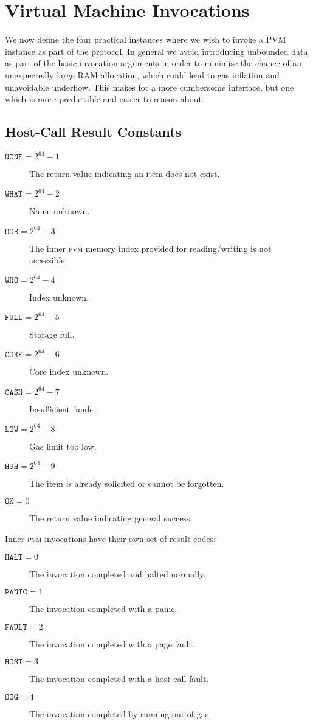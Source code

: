 \section{Virtual Machine Invocations}\label{sec:virtualmachineinvocations}

We now define the four practical instances where we wish to invoke a PVM instance as part of the protocol. In general we avoid introducing unbounded data as part of the basic invocation arguments in order to minimise the chance of an unexpectedly large RAM allocation, which could lead to gas inflation and unavoidable underflow. This makes for a more cumbersome interface, but one which is more predictable and easier to reason about.

\newcommand*{\pvm}{\mathbf{M}}
\newcommand*{\segoff}{\varsigma}
\newcommand*{\execst}{\varepsilon}

\subsection{Host-Call Result Constants}

\begin{description}
  \item[$\mathtt{NONE} = 2^{64} - 1$] The return value indicating an item does not exist.
  \item[$\mathtt{WHAT} = 2^{64} - 2$] Name unknown.
  \item[$\mathtt{OOB} = 2^{64} - 3$] The inner \textsc{pvm} memory index provided for reading/writing is not accessible.
  \item[$\mathtt{WHO} = 2^{64} - 4$] Index unknown.
  \item[$\mathtt{FULL} = 2^{64} - 5$] Storage full.
  \item[$\mathtt{CORE} = 2^{64} - 6$] Core index unknown.
  \item[$\mathtt{CASH} = 2^{64} - 7$] Insufficient funds.
  \item[$\mathtt{LOW} = 2^{64} - 8$] Gas limit too low.
  \item[$\mathtt{HUH} = 2^{64} - 9$] The item is already solicited or cannot be forgotten.
  \item[$\mathtt{OK} = 0$] The return value indicating general success.
\end{description}

Inner \textsc{pvm} invocations have their own set of result codes:
\begin{description}
  \item[$\mathtt{HALT} = 0$] The invocation completed and halted normally.
  \item[$\mathtt{PANIC} = 1$] The invocation completed with a panic.
  \item[$\mathtt{FAULT} = 2$] The invocation completed with a page fault.
  \item[$\mathtt{HOST} = 3$] The invocation completed with a host-call fault.
  \item[$\mathtt{OOG} = 4$] The invocation completed by running out of gas.
\end{description}

